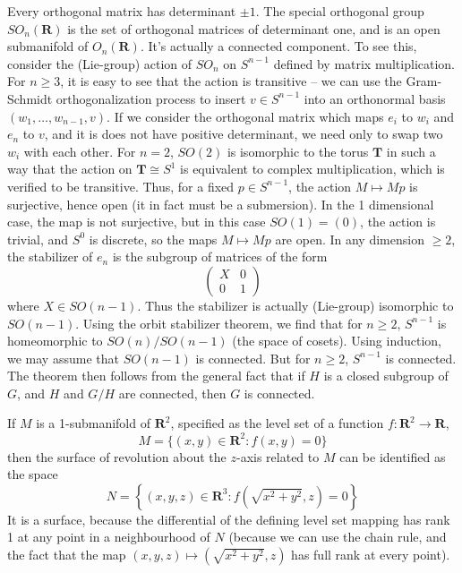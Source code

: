 \begin{example}
    Every orthogonal matrix has determinant $\pm 1$. The special orthogonal group $SO_n(\mathbf{R})$ is the set of orthogonal matrices of determinant one, and is an open submanifold of $O_n(\mathbf{R})$. It's actually a connected component. To see this, consider the (Lie-group) action of $SO_n$ on $S^{n-1}$ defined by matrix multiplication. For $n \geq 3$, it is easy to see that the action is transitive -- we can use the Gram-Schmidt orthogonalization process to insert $v \in S^{n-1}$ into an orthonormal basis $(w_1, \dots, w_{n-1}, v)$. If we consider the orthogonal matrix which maps $e_i$ to $w_i$ and $e_n$ to $v$, and it is does not have positive determinant, we need only to swap two $w_i$ with each other. For $n = 2$, $SO(2)$ is isomorphic to the torus $\mathbf{T}$ in such a way that the action on $\mathbf{T} \cong S^1$ is equivalent to complex multiplication, which is verified to be transitive. Thus, for a fixed $p \in S^{n-1}$, the action $M \mapsto Mp$ is surjective, hence open (it in fact must be a submersion). In the 1 dimensional case, the map is not surjective, but in this case $SO(1) = (0)$, the action is trivial, and $S^0$ is discrete, so the maps $M \mapsto Mp$ are open. In any dimension $\geq 2$, the stabilizer of $e_n$ is the subgroup of matrices of the form
    \[ \begin{pmatrix} X & 0 \\ 0 & 1 \end{pmatrix} \]
    where $X \in SO(n-1)$. Thus the stabilizer is actually (Lie-group) isomorphic to $SO(n-1)$. Using the orbit stabilizer theorem, we find that for $n \geq 2$, $S^{n-1}$ is homeomorphic to $SO(n)/SO(n-1)$ (the space of cosets). Using induction, we may assume that $SO(n-1)$ is connected. But for $n \geq 2$, $S^{n-1}$ is connected. The theorem then follows from the general fact that if $H$ is a closed subgroup of $G$, and $H$ and $G/H$ are connected, then $G$ is connected.
\end{example}

\begin{example}
    If $M$ is a 1-submanifold of $\mathbf{R}^2$, specified as the level set of a function $f: \mathbf{R}^2 \to \mathbf{R}$,
    \[ M = \{ (x,y) \in \mathbf{R}^2: f(x,y) = 0 \} \]
    then the surface of revolution about the $z$-axis related to $M$ can be identified as the space
    \[ N = \left\{ (x,y,z) \in \mathbf{R}^3: f \left( \sqrt{x^2 + y^2}, z \right) = 0 \right\} \]
    It is a surface, because the differential of the defining level set mapping has rank 1 at any point in a neighbourhood of $N$ (because we can use the chain rule, and the fact that the map $(x,y,z) \mapsto (\sqrt{x^2 + y^2}, z)$ has full rank at every point).
\end{example}

